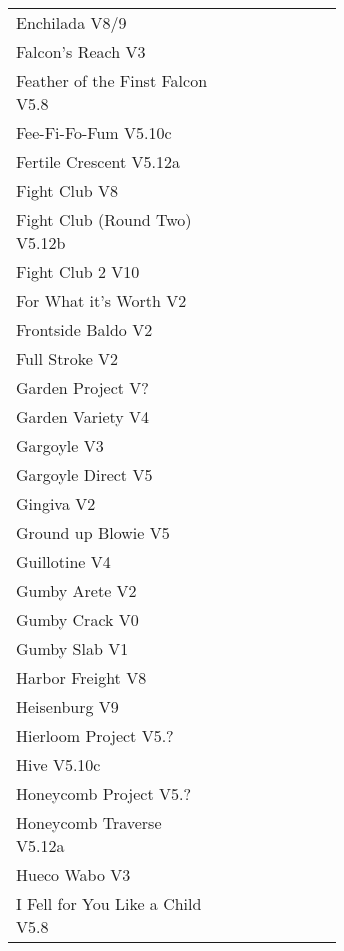 \begin{flushleft}
\begin{center}
\begin{supertabular}{p{0.65\linewidth}r}
Enchilada V8/9 & \pageref{rt:Enchilada} \\
Falcon's Reach V3 & \pageref{rt:Falcon's Reach} \\
Feather of the Finst Falcon V5.8 & \pageref{rt:Feather of the Finst Falcon} \\
Fee-Fi-Fo-Fum V5.10c & \pageref{rt:Fee-Fi-Fo-Fum} \\
Fertile Crescent V5.12a & \pageref{rt:Fertile Crescent} \\
Fight Club V8 & \pageref{rt:Fight Club} \\
Fight Club (Round Two) V5.12b & \pageref{rt:Fight Club (Round Two)} \\
Fight Club 2 V10 & \pageref{rt:Fight Club 2} \\
For What it's Worth V2 & \pageref{rt:For What it's Worth} \\
Frontside Baldo V2 & \pageref{rt:Frontside Baldo} \\
Full Stroke V2 & \pageref{rt:Full Stroke} \\
Garden Project V? & \pageref{rt:Garden Project} \\
Garden Variety V4 & \pageref{rt:Garden Variety} \\
Gargoyle V3 & \pageref{rt:Gargoyle} \\
Gargoyle Direct V5 & \pageref{vr:Gargoyle Direct} \\
Gingiva V2 & \pageref{rt:Gingiva} \\
Ground up Blowie V5 & \pageref{rt:Ground up Blowie} \\
Guillotine V4 & \pageref{rt:Guillotine} \\
Gumby Arete V2 & \pageref{rt:Gumby Arete} \\
Gumby Crack V0 & \pageref{rt:Gumby Crack} \\
Gumby Slab V1 & \pageref{rt:Gumby Slab} \\
Harbor Freight V8 & \pageref{vr:Harbor Freight} \\
Heisenburg V9 & \pageref{rt:Heisenburg} \\
Hierloom Project V5.? & \pageref{rt:Hierloom Project} \\
Hive V5.10c & \pageref{rt:Hive} \\
Honeycomb Project V5.? & \pageref{rt:Honeycomb Project} \\
Honeycomb Traverse V5.12a & \pageref{vr:Honeycomb Traverse} \\
Hueco Wabo V3 & \pageref{rt:Hueco Wabo} \\
I Fell for You Like a Child V5.8 & \pageref{rt:I Fell for You Like a Child} \\

\end{supertabular}
\end{center}
\end{flushleft}
